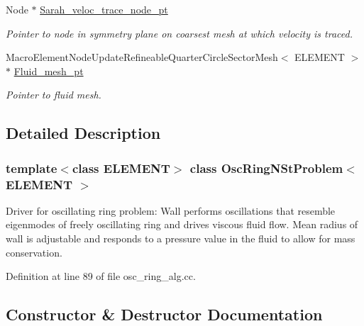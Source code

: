 \begin{DoxyCompactItemize}
Node $\ast$ \hyperlink{classOscRingNStProblem_a6688cac5da1f4092a9cd343ad5fdfd53}{Sarah\+\_\+veloc\+\_\+trace\+\_\+node\+\_\+pt}
\begin{DoxyCompactList}\small\item\em Pointer to node in symmetry plane on coarsest mesh at which velocity is traced. \end{DoxyCompactList}\item 
Macro\+Element\+Node\+Update\+Refineable\+Quarter\+Circle\+Sector\+Mesh$<$ E\+L\+E\+M\+E\+NT $>$ $\ast$ \hyperlink{classOscRingNStProblem_a7747a4f4f3bcc507376ca09649fcf6fd}{Fluid\+\_\+mesh\+\_\+pt}
\begin{DoxyCompactList}\small\item\em Pointer to fluid mesh. \end{DoxyCompactList}\end{DoxyCompactItemize}


\subsection{Detailed Description}
\subsubsection*{template$<$class E\+L\+E\+M\+E\+NT$>$\newline
class Osc\+Ring\+N\+St\+Problem$<$ E\+L\+E\+M\+E\+N\+T $>$}

Driver for oscillating ring problem\+: Wall performs oscillations that resemble eigenmodes of freely oscillating ring and drives viscous fluid flow. Mean radius of wall is adjustable and responds to a pressure value in the fluid to allow for mass conservation. 

Definition at line 89 of file osc\+\_\+ring\+\_\+alg.\+cc.



\subsection{Constructor \& Destructor Documentation}
\mbox{\label{classOscRingNStProblem_acd5f633c43eb4cfb43c45361ecf85e6b}} 
